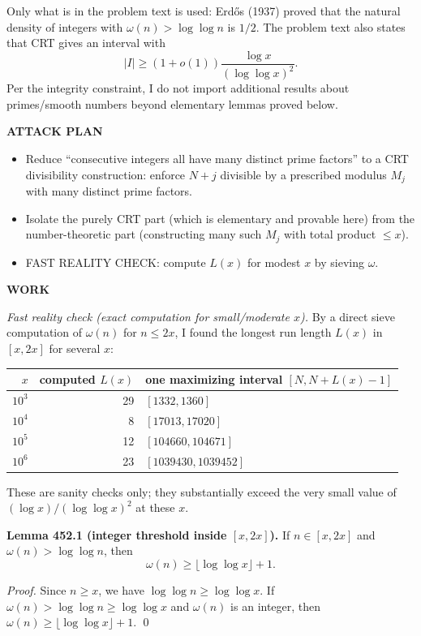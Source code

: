 Only what is in the problem text is used: Erd\H{o}s (1937) proved that the natural density of integers with $\omega(n)>\log\log n$ is $1/2$. The problem text also states that CRT gives an interval with
\[
|I|\ge (1+o(1))\frac{\log x}{(\log\log x)^2}.
\]
Per the integrity constraint, I do not import additional results about primes/smooth numbers beyond elementary lemmas proved below.

\textbf{ATTACK PLAN}

\begin{itemize}
\item Reduce ``consecutive integers all have many distinct prime factors'' to a CRT divisibility construction: enforce $N+j$ divisible by a prescribed modulus $M_j$ with many distinct prime factors.
\item Isolate the purely CRT part (which is elementary and provable here) from the number-theoretic part (constructing many such $M_j$ with total product $\le x$).
\item FAST REALITY CHECK: compute $L(x)$ for modest $x$ by sieving $\omega$.
\end{itemize}

\textbf{WORK}

\emph{Fast reality check (exact computation for small/moderate $x$).}
By a direct sieve computation of $\omega(n)$ for $n\le 2x$, I found the longest run length $L(x)$ in $[x,2x]$ for several $x$:
\begin{center}
\begin{tabular}{r|r|l}
$x$ & computed $L(x)$ & one maximizing interval $[N,N+L(x)-1]$ \\\hline
$10^3$ & 29 & $[1332,1360]$\\
$10^4$ & 8  & $[17013,17020]$\\
$10^5$ & 12 & $[104660,104671]$\\
$10^6$ & 23 & $[1039430,1039452]$\\
\end{tabular}
\end{center}
These are sanity checks only; they substantially exceed the very small value of $(\log x)/(\log\log x)^2$ at these $x$.

\medskip

\textbf{Lemma 452.1 (integer threshold inside $[x,2x]$).}
If $n\in[x,2x]$ and $\omega(n)>\log\log n$, then
\[
\omega(n)\ge \big\lfloor \log\log x\big\rfloor+1.
\]

\emph{Proof.}
Since $n\ge x$, we have $\log\log n\ge \log\log x$. If $\omega(n)>\log\log n\ge \log\log x$ and $\omega(n)$ is an integer, then $\omega(n)\ge \lfloor \log\log x\rfloor+1$.
\qed

